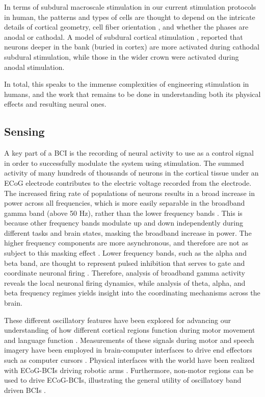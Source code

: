 In terms of subdural macroscale stimulation in our current stimulation protocols in human, the patterns and types of cells are thought to depend on the intricate details of cortical geometry, cell fiber orientation \cite{Kudela2015}, and whether the phases are anodal or cathodal. A model of subdural cortical stimulation \cite{Seo2015}, reported that neurons deeper in the bank (buried in cortex) are more activated during cathodal subdural stimulation, while those in the wider crown were activated during anodal stimulation. 

In total, this speaks to the immense complexities of engineering stimulation in humans, and the work that remains to be done in understanding both its physical effects and resulting neural ones. 

\subsection{Sensing}

A key part of a BCI is the recording of neural activity to use as a control signal in order to successfully modulate the system using stimulation. The summed activity of many hundreds of thousands of neurons in the cortical tissue under an ECoG electrode contributes to the electric voltage recorded from the electrode. The increased firing rate of populations of neurons results in a broad increase in power across all frequencies, which is more easily separable in the broadband gamma band (above 50 Hz), rather than the lower frequency bands \cite{Miller2008}. This is because other frequency bands modulate up and down independently during different tasks and brain states, masking the broadband increase in power. The higher frequency components are more asynchronous, and therefore are not as subject to this masking effect \cite{Hermes2017}. Lower frequency bands, such as the alpha and beta band, are thought to represent pulsed inhibition that serves to gate and coordinate neuronal firing \cite{Schalk2015}. Therefore, analysis of broadband gamma activity reveals the local neuronal firing dynamics, while analysis of theta, alpha, and beta frequency regimes yields insight into the coordinating mechanisms across the brain.

These different oscillatory features have been explored for advancing our understanding of how different cortical regions function during motor movement and language function \cite{Flint2017,Bouchard2013}. Measurements of these signals during motor and speech imagery have been employed in brain-computer interfaces to drive end effectors such as computer cursors \cite{Leuthardt2004,Leuthardt2006,Leuthardt2006a} . Physical interfaces with the world have been realized with ECoG-BCIs driving robotic arms \cite{Hotson2016}. Furthermore, non-motor regions can be used to drive ECoG-BCIs, illustrating the general utility of oscillatory band driven BCIs \cite{Ramsey2006,Wilson2006}.

